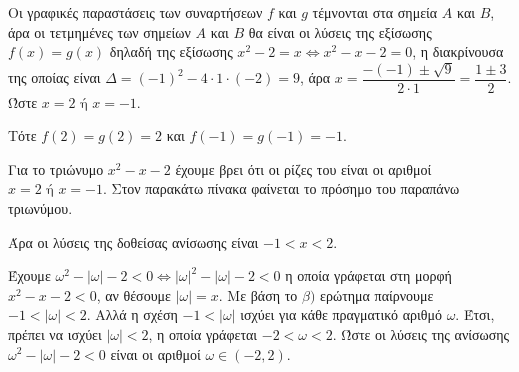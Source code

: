 
\begin{alist}
\item Οι γραφικές παραστάσεις των συναρτήσεων $f$ και $g$ τέμνονται στα σημεία $A$ και $B$, άρα οι
τετμημένες των σημείων $A$ και $B$ θα είναι οι λύσεις της εξίσωσης $f(x) = g(x)$ δηλαδή της
εξίσωσης $x^2 - 2 = x \Leftrightarrow x^2 - x - 2 = 0$, η διακρίνουσα της οποίας είναι
$\Delta = (-1)^2 - 4 \cdot 1 \cdot (-2) = 9$, άρα $x = \dfrac{-(-1) \pm \sqrt{9}}{2 \cdot 1} = \dfrac{1 \pm 3}{2}$. Ώστε $x = 2 \text{ ή } x = -1$.

Τότε $f(2) = g(2) = 2$ και $f(-1) = g(-1) = -1$.

\item Για το τριώνυμο $x^2 - x - 2$ έχουμε βρει ότι οι ρίζες του είναι οι αριθμοί
$x = 2 \text{ ή } x = -1$.
Στον παρακάτω πίνακα φαίνεται το πρόσημο του παραπάνω τριωνύμου.
\begin{center}
\end{center}

Άρα οι λύσεις της δοθείσας ανίσωσης είναι $-1 < x < 2$.

\item Έχουμε $\omega^2 - |\omega| - 2 < 0 \Leftrightarrow |\omega|^2 - |\omega| - 2 < 0$ η οποία γράφεται στη μορφή
$x^2 - x - 2 < 0$, αν θέσουμε $|\omega| = x$.
Με βάση το $\beta)$ ερώτημα παίρνουμε $-1 < |\omega| < 2$.
Αλλά η σχέση $-1 < |\omega|$ ισχύει για κάθε πραγματικό αριθμό $\omega$.
Έτσι, πρέπει να ισχύει $|\omega| < 2$, η οποία γράφεται $-2 < \omega < 2$.
Ώστε οι λύσεις της ανίσωσης $\omega^2 - |\omega| - 2 < 0$ είναι οι αριθμοί $\omega \in (-2, 2)$.
\end{alist}

